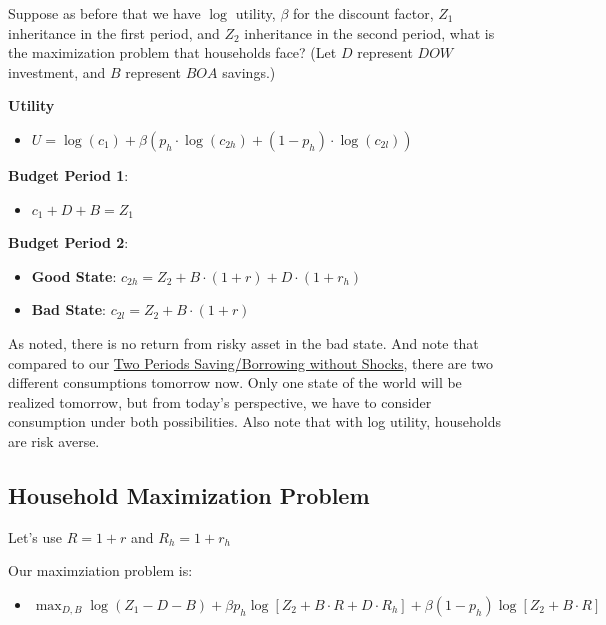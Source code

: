 \documentclass[
]{book}
\providecommand{\tightlist}{%
  \setlength{\itemsep}{0pt}\setlength{\parskip}{0pt}}
\begin{document}
Suppose as before that we have \(\log\) utility, \(\beta\) for the discount
factor, \(Z_1\) inheritance in the first period, and \(Z_2\) inheritance in
the second period, what is the maximization problem that households
face? (Let \(D\) represent \(DOW\) investment, and \(B\) represent \(BOA\)
savings.)

\textbf{Utility}

\begin{itemize}
\tightlist
\item
  \(\displaystyle U=\log (c_1 )+\beta \left(p_h \cdot \log (c_{2h} )+(1-p_h )\cdot \log (c_{2l} )\right)\)
\end{itemize}

\textbf{Budget Period 1}:

\begin{itemize}
\tightlist
\item
  \(\displaystyle c_1 +D+B=Z_1\)
\end{itemize}

\textbf{Budget Period 2}:

\begin{itemize}
\item
  \textbf{Good State}: \(c_{2h} =Z_2 +B\cdot (1+r)+D\cdot (1+r_h )\)
\item
  \textbf{Bad State}: \(c_{2l} =Z_2 +B\cdot (1+r)\)
\end{itemize}

As noted, there is no return from risky asset in the bad state. And note
that compared to our \href{https://math4econ.github.io/derivative_application/K_save_households.html}{Two Periods Saving/Borrowing without
Shocks},
there are two different consumptions tomorrow now. Only one state of the
world will be realized tomorrow, but from today's perspective, we have
to consider consumption under both possibilities. Also note that with
log utility, households are risk averse.

\hypertarget{household-maximization-problem}{%
\subsection{Household Maximization Problem}\label{household-maximization-problem}}

Let's use \(R=1+r\) and \(R_h =1+r_h\)

Our maximziation problem is:

\begin{itemize}
\tightlist
\item
  \(\displaystyle \max_{D,B} \log (Z_1 -D-B)+\beta p_h \log \left\lbrack Z_2 +B\cdot R+D\cdot R_h \right\rbrack +\beta (1-p_h )\log \left\lbrack Z_2 +B\cdot R\right\rbrack\)
\end{itemize}
\end{document}
